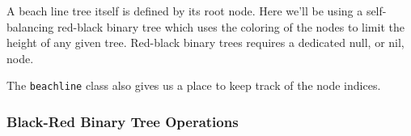 \documentclass[
  letterpaper,
  DIV=11,
  numbers=noendperiod]{scrartcl}
\newenvironment{Shaded}{\begin{snugshade}}{\end{snugshade}}
\newcommand{\AttributeTok}[1]{\textcolor[rgb]{0.40,0.45,0.13}{#1}}
\newcommand{\ConstantTok}[1]{\textcolor[rgb]{0.56,0.35,0.01}{#1}}
\newcommand{\ControlFlowTok}[1]{\textcolor[rgb]{0.00,0.23,0.31}{#1}}
\newcommand{\DecValTok}[1]{\textcolor[rgb]{0.68,0.00,0.00}{#1}}
\newcommand{\FunctionTok}[1]{\textcolor[rgb]{0.28,0.35,0.67}{#1}}
\newcommand{\NormalTok}[1]{\textcolor[rgb]{0.00,0.23,0.31}{#1}}
\newcommand{\OtherTok}[1]{\textcolor[rgb]{0.00,0.23,0.31}{#1}}
\newcommand{\SpecialCharTok}[1]{\textcolor[rgb]{0.37,0.37,0.37}{#1}}
\newcommand{\StringTok}[1]{\textcolor[rgb]{0.13,0.47,0.30}{#1}}
\begin{document}
\begin{Shaded}
\end{Shaded}

A beach line tree itself is defined by its root node. Here we'll be
using a self-balancing red-black binary tree which uses the coloring of
the nodes to limit the height of any given tree. Red-black binary trees
requires a dedicated null, or nil, node.

\begin{Shaded}
\end{Shaded}

The \texttt{beachline} class also gives us a place to keep track of the
node indices.

\subsubsection{Black-Red Binary Tree
Operations}\label{black-red-binary-tree-operations}
\end{document}
